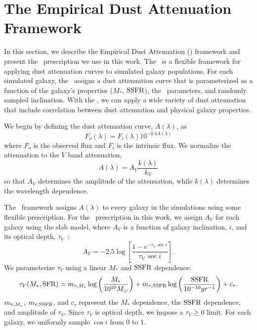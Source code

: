 \section{The Empirical Dust Attenuation Framework} \label{sec:dem}
In this section, we describe the Empirical Dust Attenuation (\eda)
framework and present the \eda~prescription we use in this work. 
The \eda~is a flexible framework for applying dust attenuation curves to
simulated galaxy populations.
For each simulated galaxy, the \eda~assigns a dust attenuation
curve that is parameterized as a function of the galaxy's properties 
($M_*$, ${\rm SSFR}$), the \eda~parameters, and randomly
sampled inclination. With the \eda, we can apply a wide variety of dust
attenuation that include correlation between dust attenuation and physical
galaxy properties. 

We begin by defining the dust attenuation curve, $A(\lambda)$, as 
\begin{equation} \label{eq:full_atten}
    F_o (\lambda) = F_i (\lambda) 10^{-0.4 A(\lambda)}
\end{equation}
where $F_o$ is the observed flux and $F_i$ is the intrinsic flux. We normalize
the attenuation to the $V$ band attenuation, 
\begin{equation} 
    A(\lambda) = A_V \frac{k(\lambda)}{k_V}
\end{equation}
so that $A_V$ determines the amplitude of the attenuation, while $k(\lambda)$
determines the wavelength dependence. 

The \eda~framework assigns $A(\lambda)$ to every galaxy in the simulations
using some flexible prescription. For the \eda~prescription in this work,
we assign $A_V$ for each galaxy using the slab model, where $A_V$ is a
function of galaxy inclination, $i$, and its optical depth,
$\tau_V$~\citep[\eg][]{somerville1999, somerville2012}: 
\begin{equation} \label{eq:slab}
    A_V = -2.5 \log \left[ \frac{1 - e^{-\tau_V\,\sec i}}{\tau_V\,\sec i} \right].
\end{equation}
We parameterize $\tau_V$ using a linear $M_*$ and ${\rm SSFR}$ dependence: 
\begin{equation} \label{eq:tauv}
    \tau_V(M_*, \sfr) = \mtaum \log \left(\frac{M_*}{10^{10} M_\odot}\right) +
    \mtaus \log \left(\frac{\ssfr}{10^{-10}yr^{-1}}\right) + c_\tau.
\end{equation}
$m_{\tau,M_*}$, $m_{\tau,{\rm SSFR}}$, and $c_\tau$ represent the $M_*$ dependence, the ${\rm SSFR}$
dependence, and amplitude of $\tau_V$. Since $\tau_V$ is optical depth, we
impose a $\tau_V \ge 0$ limit.
For each galaxy, we uniformly sample $\cos i$ from 0 to 1. 

